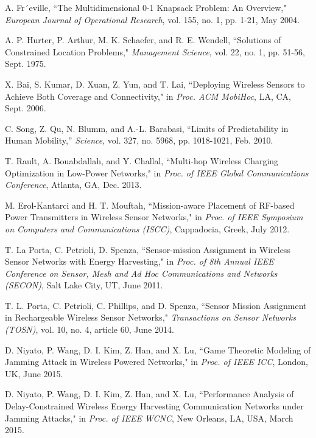 \documentclass[twocolumn,10pt]{IEEEtran}
\begin{document}
\begin{thebibliography}{99}
 
A. Fr´eville, ``The Multidimensional 0-1 Knapsack Problem: An
Overview," \emph{European Journal of Operational Research}, vol. 155, no. 1, pp. 1-21, May 2004.

A. P. Hurter, P. Arthur, M. K. Schaefer, and R. E. Wendell, ``Solutions of Constrained Location Problems," \emph{Management Science}, vol. 22, no. 1, pp. 51-56, Sept. 1975.  
 
X. Bai, S. Kumar, D. Xuan, Z. Yun, and T. Lai, ``Deploying
Wireless Sensors to Achieve Both Coverage and Connectivity,"
in \emph{Proc. ACM MobiHoc}, LA, CA,  Sept. 2006. 
 
C. Song, Z. Qu, N. Blumm, and A.-L. Barabasi, ``Limits of Predictability
in Human Mobility,” \emph{Science}, vol. 327, no. 5968, pp. 1018-1021, Feb. 2010.
 
T. Rault, A. Bouabdallah, and Y. Challal, ``Multi-hop Wireless Charging Optimization in Low-Power Networks," in \emph{Proc. of IEEE Global Communications Conference}, Atlanta, GA,  Dec. 2013.   
 
M. Erol-Kantarci and H. T. Mouftah, ``Mission-aware Placement of RF-based Power Transmitters in Wireless Sensor Networks," in \emph{Proc. of IEEE Symposium on Computers and Communications (ISCC)}, Cappadocia, Greek, July 2012.   



T. La Porta, C. Petrioli, D. Spenza, ``Sensor-mission Assignment in
Wireless Sensor Networks with Energy Harvesting," in \emph{Proc. of 8th Annual IEEE Conference on Sensor, Mesh and Ad Hoc Communications and
Networks (SECON)}, Salt Lake City, UT, June 2011.

T. L. Porta, C. Petrioli, C. Phillips, and D. Spenza, ``Sensor Mission Assignment in Rechargeable Wireless Sensor Networks," \emph{Transactions on Sensor Networks (TOSN)}, vol. 10, no. 4, article 60,  June 2014.


 
D. Niyato, P. Wang, D. I. Kim, Z. Han, and X. Lu, ``Game Theoretic Modeling of Jamming Attack in Wireless Powered Networks," in \emph{Proc. of  IEEE ICC}, London, UK, June 2015.  
 
D. Niyato, P. Wang, D. I. Kim, Z. Han, and X. Lu, ``Performance Analysis of Delay-Constrained Wireless Energy Harvesting Communication Networks under Jamming Attacks," in \emph{Proc. of IEEE WCNC}, New Orleans, LA, USA, March 2015. 
 

\end{thebibliography}
\end{document}
